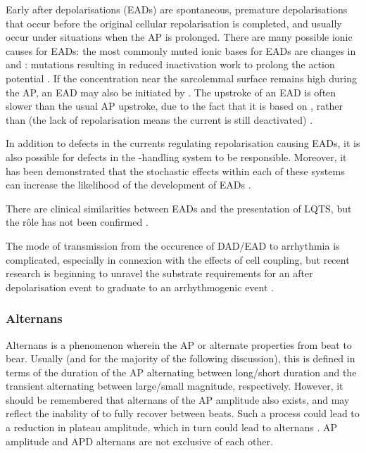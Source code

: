 \documentclass[../thesis-main.tex]{subfiles}
\begin{document}
Early after depolarisations (EADs) are spontaneous, premature depolarisations that occur before the original cellular repolarisation is completed, and usually occur under situations when the AP is prolonged. There are many possible ionic causes for EADs: the most commonly muted ionic bases for EADs are changes in \ica{} and \ina{}: \ina{} mutations resulting in reduced inactivation work to prolong the action potential \citep{Clancy2005, Hashambhoy2011, Hiraoka1992}. If the \ca{} concentration near the sarcolemmal surface remains high during the AP, an EAD may also be initiated by \inaca{ } \citep{Volders1997}. The upstroke of an EAD is often slower than the usual AP upstroke, due to the fact that it is based on \ica{}, rather than \ina{} (the lack of repolarisation means the \ina{} current is still deactivated) \citep{Clusin2003}.

In addition to defects in the currents regulating repolarisation causing EADs, it is also possible for defects in the \ca{}-handling system to be responsible. Moreover, it has been demonstrated that the stochastic effects within each of these systems can increase the likelihood of the development of EADs \citep{Tanskanen2005, Sato2009, Heijman2013}.

There are clinical similarities between EADs and the presentation of LQTS, but the r\^ole has not been confirmed \citep{Clusin2003}.

The mode of transmission from the occurence of DAD/EAD to arrhythmia is complicated, especially in connexion with the effects of cell coupling, but recent research is beginning to unravel the substrate requirements for an after depolarisation event to graduate to an arrhythmogenic event \citep{Tanskanen2005}.

\subsubsection{Alternans}
\label{subsubsec:alternans}
Alternans is a phenomenon wherein the AP or \cai{} alternate properties from beat to bear. Usually (and for the majority of the following discussion), this is defined in terms of the duration of the AP alternating between long/short duration and the  \cai{} transient alternating between large/small magnitude, respectively. However, it should be remembered that alternans of the AP amplitude also exists, and may reflect the inability of \ina{} to fully recover between beats. Such a process could lead to a reduction in plateau amplitude, which in turn could lead to \cai{} alternans \citep{Clusin2003}. AP amplitude and APD alternans are not exclusive of each other.
\end{document}
